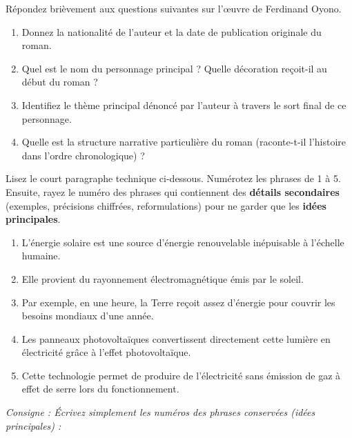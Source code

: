 \documentclass[11pt]{article}
\begin{document}
\begin{exercice}
Répondez brièvement aux questions suivantes sur l'œuvre de Ferdinand Oyono.
\begin{enumerate}
    \item Donnez la nationalité de l'auteur et la date de publication originale du roman.
    \item Quel est le nom du personnage principal ? Quelle décoration reçoit-il au début du roman ?
    \item Identifiez le thème principal dénoncé par l'auteur à travers le sort final de ce personnage.
    \item Quelle est la structure narrative particulière du roman (raconte-t-il l'histoire dans l'ordre chronologique) ?
\end{enumerate}
\end{exercice}

\begin{exercice}
Lisez le court paragraphe technique ci-dessous. Numérotez les phrases de 1 à 5. Ensuite, rayez le numéro des phrases qui contiennent des \textbf{détails secondaires} (exemples, précisions chiffrées, reformulations) pour ne garder que les \textbf{idées principales}.
\begin{enumerate}
    \item L'énergie solaire est une source d'énergie renouvelable inépuisable à l'échelle humaine.
    \item Elle provient du rayonnement électromagnétique émis par le soleil.
    \item Par exemple, en une heure, la Terre reçoit assez d'énergie pour couvrir les besoins mondiaux d'une année.
    \item Les panneaux photovoltaïques convertissent directement cette lumière en électricité grâce à l'effet photovoltaïque.
    \item Cette technologie permet de produire de l'électricité sans émission de gaz à effet de serre lors du fonctionnement.
\end{enumerate}
\textit{Consigne : Écrivez simplement les numéros des phrases conservées (idées principales) : \underline{\hspace{10cm}}}
\end{exercice}
\end{document}
